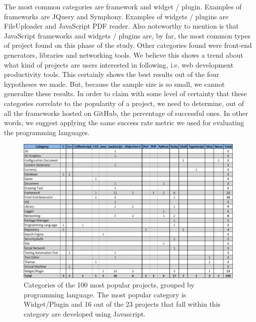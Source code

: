 The most common categories are framework and widget / plugin. Examples of frameworks are JQuery and Symphony. Examples of widgets / plugins are FileUploader and JavaScript PDF reader. Also noteworthy to mention is that JavaScript frameworks and widgets / plugins are, by far, the most common types of project found on this phase of the study. Other categories found were front-end generators, libraries and networking tools. We believe this shows a trend about what kind of projects are users interested in following, i.e. web development productivity tools. This certainly shows the best results out of the four hypotheses we made. But, because the sample size is so small, we cannot generalize these results. In order to claim with some level of certainty that these categories correlate to the popularity of a project, we need to determine, out of all the frameworks hosted on GitHub, the percentage of successful ones. In other words, we suggest applying the same success rate metric we used for evaluating the programming languages.
\begin{figure}[ht]
	\centering
	\includegraphics[width=\textwidth]{./img/categories.png}
	\caption{Categories of the 100 most popular projects, grouped by programming language. The most popular category is Widget/Plugin and 16 out of the 23 projects that fall within this category are developed using Javascript.}
	\label{fig:categories}
\end{figure}
